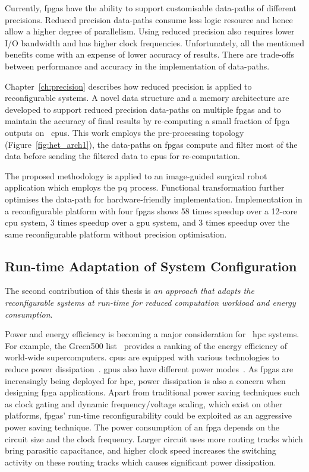 Currently, \glspl{fpga} have the ability to support customisable data-paths of different precisions.
Reduced precision data-paths consume less logic resource and hence allow a higher degree of parallelism.
Using reduced precision also requires lower I/O bandwidth and has higher clock frequencies.
Unfortunately, all the mentioned benefits come with an expense of lower accuracy of results.
There are trade-offs between performance and accuracy in the implementation of data-paths.

Chapter~\ref{ch:precision} describes how reduced precision is applied to reconfigurable systems.
A novel data structure and a memory architecture are developed to support reduced precision data-paths on multiple \glspl{fpga} and to maintain the accuracy of final results by re-computing a small fraction of \gls{fpga} outputs on ~\glspl{cpu}.
This work employs the pre-processing topology (Figure~\ref{fig:het_arch1}), the data-paths on \glspl{fpga} compute and filter most of the data before sending the filtered data to \glspl{cpu} for re-computation.

The proposed methodology is applied to an image-guided surgical robot application which employs the \gls{pq} process.
Functional transformation further optimises the data-path for hardware-friendly implementation.
Implementation in a reconfigurable platform with four \glspl{fpga} shows 58 times speedup over a 12-core \gls{cpu} system, 3 times speedup over a \gls{gpu} system, and 3 times speedup over the same reconfigurable platform without precision optimisation.

\subsection{Run-time Adaptation of System Configuration}

The second contribution of this thesis is \textit{an approach that adapts the reconfigurable systems at run-time for reduced computation workload and energy consumption}.

Power and energy efficiency is becoming a major consideration for ~\gls{hpc} systems.
For example, the Green500 list~\cite{green500} provides a ranking of the energy efficiency of world-wide supercomputers.
\glspl{cpu} are equipped with various technologies to reduce power dissipation~\cite{intelsleep,intelturboboost}.
\glspl{gpu} also have different power modes~\cite{amdpower,nvidiapower}.
As \glspl{fpga} are increasingly being deployed for \gls{hpc}, power dissipation is also a concern when designing \gls{fpga} applications.
Apart from traditional power saving techniques such as clock gating and dynamic frequency/voltage scaling, which exist on other platforms, \glspl{fpga}' run-time reconfigurability could be exploited as an aggressive power saving technique.
The power consumption of an \gls{fpga} depends on the circuit size and the clock frequency.
Larger circuit uses more routing tracks which bring parasitic capacitance,
and higher clock speed increases the switching activity on these routing tracks which causes significant power dissipation.

